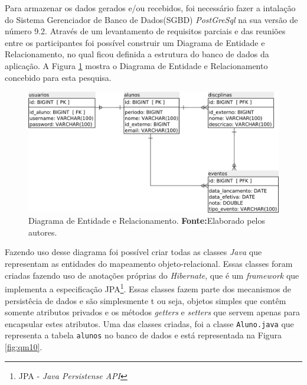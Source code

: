 		\par Para armazenar os dados gerados e/ou recebidos, foi necessário fazer a
	intalação do Sistema Gerenciador de Banco de Dados(SGBD) \textit{PostGreSql} na
	sua versão de número 9.2. Através de um levantamento de requisitos parciais e das
	reuniões entre os participantes foi possível construir um Diagrama de Entidade
	e Relacionamento, no qual ficou definida a estrutura do banco de dados da
	aplicação. A Figura \ref{fig:qm9} mostra o Diagrama de Entidade e
	Relacionamento concebido para esta pesquisa.

		\begin{figure}[h!]
			\centerline{\includegraphics[scale=0.4]{./imagens/2_q_metodologico/qm9.png}}
			\caption[Diagrama de Entidade e Relacionamento]{Diagrama de Entidade e
			Relacionamento.
			\textbf{Fonte:}Elaborado pelos autores.}
			\label{fig:qm9}
		\end{figure}
\pagebreak
		\par Fazendo uso desse diagrama foi possível criar todas as classes 
	\textit{Java} que representam as entidades do mapeamento objeto-relacional. 
	Essas classes foram criadas fazendo uso de anotações próprias do
	\textit{Hibernate}, que é um \textit{framework} que implementa a especificação
	JPA\footnote{JPA - \textit{Java Persistense API}}. Essas classes fazem parte
	dos mecanismos de persistêcia de dados e são simplesmente t ou seja, objetos
	simples que contêm somente atributos privados e os métodos \textit{getters} e
	\textit{setters} que servem apenas para encapsular estes atributos. Uma das
	classes criadas, foi a classe \texttt{Aluno.java} que representa a tabela
	\texttt{alunos} no banco de dados e está representada na Figura
	\ref{fig:qm10}.%
	
